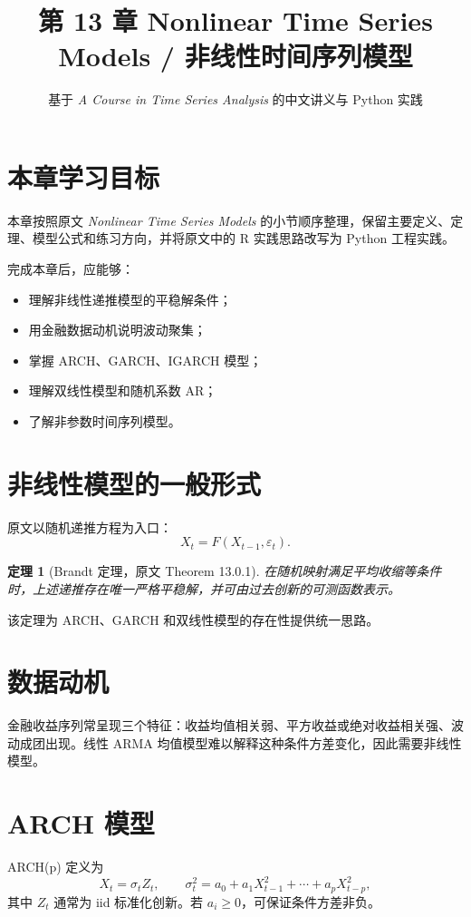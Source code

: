 \documentclass[11pt,a4paper]{ctexart}
\title{第 13 章 \quad Nonlinear Time Series Models / 非线性时间序列模型}
\author{基于 \textit{A Course in Time Series Analysis} 的中文讲义与 Python 实践}
\date{}
\newtheorem{theorem}{定理}[section]
\begin{document}
\maketitle

\section*{本章学习目标}

本章按照原文 \textit{Nonlinear Time Series Models} 的小节顺序整理，保留主要定义、定理、模型公式和练习方向，并将原文中的 R 实践思路改写为 Python 工程实践。

完成本章后，应能够：
\begin{itemize}
  \item 理解非线性递推模型的平稳解条件；
  \item 用金融数据动机说明波动聚集；
  \item 掌握 ARCH、GARCH、IGARCH 模型；
  \item 理解双线性模型和随机系数 AR；
  \item 了解非参数时间序列模型。
\end{itemize}

\section{非线性模型的一般形式}

原文以随机递推方程为入口：
\[
  X_t=F(X_{t-1},\varepsilon_t).
\]
\begin{theorem}[Brandt 定理，原文 Theorem 13.0.1]
在随机映射满足平均收缩等条件时，上述递推存在唯一严格平稳解，并可由过去创新的可测函数表示。
\end{theorem}

该定理为 ARCH、GARCH 和双线性模型的存在性提供统一思路。

\section{数据动机}

金融收益序列常呈现三个特征：收益均值相关弱、平方收益或绝对收益相关强、波动成团出现。线性 ARMA 均值模型难以解释这种条件方差变化，因此需要非线性模型。

\section{ARCH 模型}

ARCH(p) 定义为
\[
  X_t=\sigma_t Z_t,\qquad
  \sigma_t^2=a_0+a_1X_{t-1}^2+\cdots+a_pX_{t-p}^2,
\]
其中 \(Z_t\) 通常为 iid 标准化创新。若 \(a_i\ge0\)，可保证条件方差非负。
\end{document}
